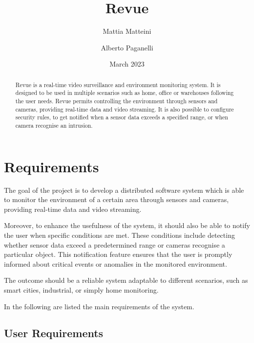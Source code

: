 \documentclass{scrartcl}
\title{
    Revue
}
\author{
    Mattia Matteini \\ \emailaddr{mattia.matteini@studio.unibo.it}
    \and
    Alberto Paganelli \\ \emailaddr{alberto.paganelli3@studio.unibo.it}
}
\date{March 2023}
\begin{document}
    \maketitle

    \begin{abstract}
        Revue is a real-time video surveillance and environment monitoring system.
        It is designed to be used in multiple scenarios such as home, office or warehouses following the user needs.
%
        Revue permits controlling the environment through sensors and cameras, providing real-time data and video streaming.
        It is also possible to configure security rules, to get notified when a sensor data exceeds a specified range, or when camera recognise an intrusion.
    \end{abstract}


    \section{Requirements}

    The goal of the project is to develop a distributed software system which is able to monitor the environment
    of a certain area through sensors and cameras, providing real-time data and video streaming.

    Moreover, to enhance the usefulness of the system, it should also be able to notify the user when specific conditions are met.
    These conditions include detecting whether sensor data exceed a predetermined range or cameras recognise a particular object.
    This notification feature ensures that the user is promptly informed about critical
    events or anomalies in the monitored environment.

    The outcome should be a reliable system adaptable to different scenarios, such as smart cities, industrial, or
    simply home monitoring.

    In the following are listed the main requirements of the system.

    \subsection{User Requirements}\label{subsec:user-requirements}
\end{document}
